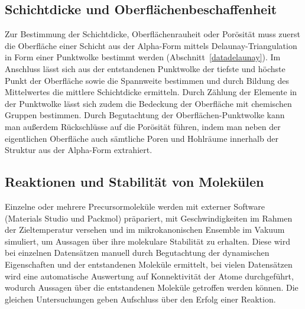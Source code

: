 \subsection{Schichtdicke und Oberflächenbeschaffenheit}
\label{mdmethods-surface}

Zur Bestimmung der Schichtdicke, Oberflächenrauheit oder Porösität muss zuerst die Oberfläche einer Schicht aus der Alpha-Form mittels Delaunay-Triangulation in Form einer Punktwolke bestimmt werden (Abschnitt~\ref{datadelaunay}).
Im Anschluss lässt sich aus der entstandenen Punktwolke der tiefste und höchste Punkt der Oberfläche sowie die Spannweite bestimmen und durch Bildung des Mittelwertes die mittlere Schichtdicke ermitteln.
Durch Zählung der Elemente in der Punktwolke lässt sich zudem die Bedeckung der Oberfläche mit chemischen Gruppen bestimmen.
Durch Begutachtung der Oberflächen-Punktwolke kann man außerdem Rückschlüsse auf die Porösität führen, indem man neben der eigentlichen Oberfläche auch sämtliche Poren und Hohlräume innerhalb der Struktur aus der Alpha-Form extrahiert.

\subsection{Reaktionen und Stabilität von Molekülen}

Einzelne oder mehrere Precursormoleküle werden mit externer Software (Materials Studio\cite{biovia_materials_2014} und Packmol) präpariert, mit Geschwindigkeiten im Rahmen der Zieltemperatur versehen und im mikrokanonischen Ensemble im Vakuum simuliert, um Aussagen über ihre molekulare Stabilität zu erhalten.
Diese wird bei einzelnen Datensätzen manuell durch Begutachtung der dynamischen Eigenschaften und der entstandenen Moleküle ermittelt, bei vielen Datensätzen wird eine automatische Auswertung auf Konnektivität der Atome durchgeführt, wodurch Aussagen über die entstandenen Moleküle getroffen werden können.
Die gleichen Untersuchungen geben Aufschluss über den Erfolg einer Reaktion.

